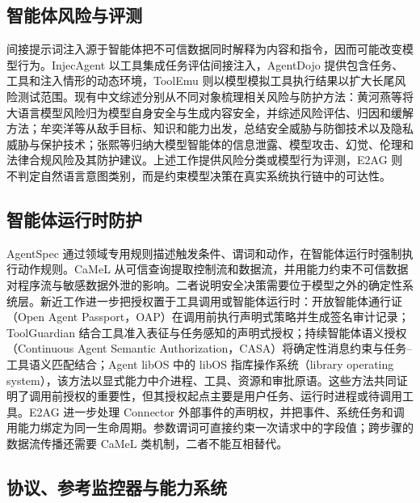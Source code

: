 \subsection{智能体风险与评测}

间接提示词注入源于智能体把不可信数据同时解释为内容和指令，因而可能改变模型行为。InjecAgent 以工具集成任务评估间接注入，AgentDojo 提供包含任务、工具和注入情形的动态环境，ToolEmu 则以模型模拟工具执行结果以扩大长尾风险测试范围\cite{injecagent,agentdojo,toolemu}。现有中文综述分别从不同对象梳理相关风险与防护方法：黄河燕等将大语言模型风险归为模型自身安全与生成内容安全，并综述风险评估、归因和缓解方法\cite{huang-llm-safety}；牟奕洋等从敌手目标、知识和能力出发，总结安全威胁与防御技术以及隐私威胁与保护技术\cite{mu-llm-security}；张熙等归纳大模型智能体的信息泄露、模型攻击、幻觉、伦理和法律合规风险及其防护建议\cite{zhang-agent-security}。上述工作提供风险分类或模型行为评测，E2AG 则不判定自然语言意图类别，而是约束模型决策在真实系统执行链中的可达性。

\subsection{智能体运行时防护}

AgentSpec 通过领域专用规则描述触发条件、谓词和动作，在智能体运行时强制执行动作规则\cite{agentspec}。CaMeL 从可信查询提取控制流和数据流，并用能力约束不可信数据对程序流与敏感数据外泄的影响\cite{camel}。二者说明安全决策需要位于模型之外的确定性系统层。新近工作进一步把授权置于工具调用或智能体运行时：开放智能体通行证（Open Agent Passport，OAP）在调用前执行声明式策略并生成签名审计记录\cite{oap}；ToolGuardian 结合工具准入表征与任务感知的声明式授权\cite{toolguardian}；持续智能体语义授权（Continuous Agent Semantic Authorization，CASA）将确定性消息约束与任务--工具语义匹配结合\cite{casa}；Agent libOS 中的 libOS 指库操作系统（library operating system），该方法以显式能力中介进程、工具、资源和审批原语\cite{agent-libos}。这些方法共同证明了调用前授权的重要性，但其授权起点主要是用户任务、运行时进程或待调用工具。E2AG 进一步处理 Connector 外部事件的声明权，并把事件、系统任务和调用能力绑定为同一生命周期。参数谓词可直接约束一次请求中的字段值；跨步骤的数据流传播还需要 CaMeL 类机制，二者不能互相替代。

\subsection{协议、参考监控器与能力系统}

